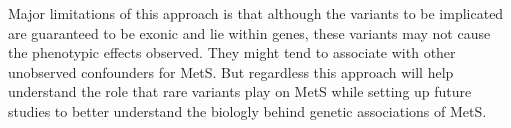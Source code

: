 \documentclass[11pt]{article}
\begin{document}
Major limitations of this approach is that although the variants to be implicated are guaranteed to be exonic and lie within genes, these variants may not cause the phenotypic effects observed. They might tend to associate with other unobserved confounders for MetS. But regardless this approach will help understand the role that rare variants play on MetS while setting up future studies to better understand the biologly behind genetic associations of MetS.

\newpage

 

\end{document}
